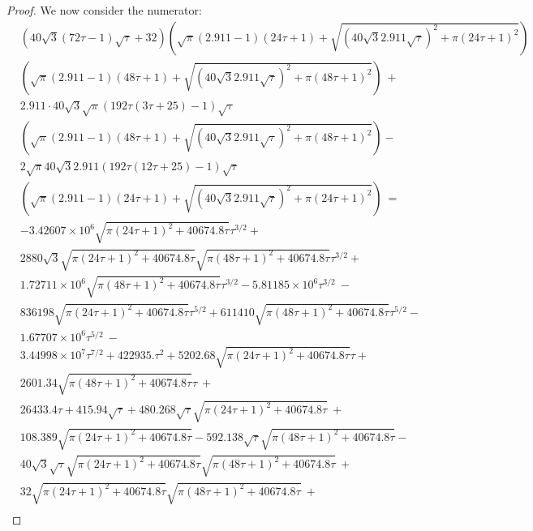 \documentclass{article}
\begin{document}
\begin{proof}
We now consider the numerator:
\begin{align}
\label{eq:start2}
&\left(40 \sqrt{3} (72  \tau-1) \sqrt{\tau}+32\right) \left(\sqrt{\pi } (2.911 -1) (24 \tau+1)+\sqrt{\left(40 \sqrt{3} 2.911 \sqrt{\tau}\right)^2+\pi  (24 \tau+1)^2}\right) \\\nonumber
& \left(\sqrt{\pi } (2.911 -1) (48 \tau+1)+\sqrt{\left(40 \sqrt{3} 2.911 \sqrt{\tau}\right)^2+\pi  (48 \tau+1)^2}\right) \ +\\ \nonumber 
&2.911 \cdot 40 \sqrt{3} \sqrt{\pi } (192  \tau (3 \tau+25)-1) \sqrt{\tau} \\\nonumber 
&  \left(\sqrt{\pi } (2.911 -1) (48 \tau+1)+\sqrt{\left(40 \sqrt{3} 2.911 \sqrt{\tau}\right)^2+\pi  (48 \tau+1)^2}\right)- \\\nonumber 
& 2 \sqrt{\pi } 40 \sqrt{3} 2.911 (192  \tau (12  \tau+25)-1) \sqrt{\tau} \\\nonumber 
&  \left(\sqrt{\pi } (2.911 -1) (24 \tau+1)+\sqrt{\left(40 \sqrt{3} 2.911 \sqrt{\tau}\right)^2+\pi  (24 \tau+1)^2}\right)\ = \\ \nonumber &
-3.42607\times 10^6 \sqrt{\pi  (24 \tau+1)^2+40674.8 \tau} \tau^{3/2}+\\ \nonumber 
&2880 \sqrt{3} \sqrt{\pi  (24 \tau+1)^2+40674.8 \tau} \sqrt{\pi  (48 \tau+1)^2+40674.8 \tau} \tau^{3/2}+\\ \nonumber
&1.72711\times 10^6 \sqrt{\pi  (48 \tau+1)^2+40674.8 \tau} \tau^{3/2}-5.81185\times 10^6 \tau^{3/2}\ - \\ \nonumber
&836198 \sqrt{\pi  (24 \tau+1)^2+40674.8 \tau} \tau^{5/2}+611410 \sqrt{\pi  (48 \tau+1)^2+40674.8 \tau} \tau^{5/2}-\\ \nonumber 
&1.67707\times 10^6 \tau^{5/2}\ - \\ \nonumber &3.44998\times 10^7 \tau^{7/2}+422935. \tau^2+5202.68 \sqrt{\pi  (24 \tau+1)^2+40674.8 \tau} \tau+\\ \nonumber 
&2601.34 \sqrt{\pi  (48 \tau+1)^2+40674.8 \tau} \tau\ + \\ \nonumber 
&26433.4 \tau+415.94 \sqrt{\tau}+480.268 \sqrt{\tau} \sqrt{\pi  (24 \tau+1)^2+40674.8 \tau}\ + \\ \nonumber 
&108.389 \sqrt{\pi  (24 \tau+1)^2+40674.8 \tau}-592.138 \sqrt{\tau} \sqrt{\pi  (48 \tau+1)^2+40674.8 \tau}-\\ \nonumber
&40 \sqrt{3} \sqrt{\tau} \sqrt{\pi  (24 \tau+1)^2+40674.8 \tau} \sqrt{\pi  (48 \tau+1)^2+40674.8 \tau}\ + \\ \nonumber 
&32 \sqrt{\pi  (24 \tau+1)^2+40674.8 \tau} \sqrt{\pi  (48 \tau+1)^2+40674.8 \tau}\ + \\ \nonumber 

\end{align}
\end{proof}
\end{document}
